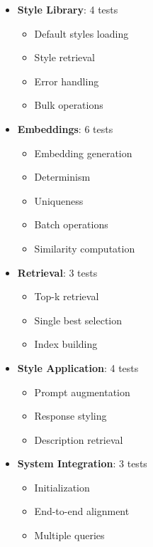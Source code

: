 \documentclass[11pt,a4paper]{article}
\begin{document}
\begin{itemize}
    \item \textbf{Style Library}: 4 tests
    \begin{itemize}
        \item Default styles loading
        \item Style retrieval
        \item Error handling
        \item Bulk operations
    \end{itemize}
    
    \item \textbf{Embeddings}: 6 tests
    \begin{itemize}
        \item Embedding generation
        \item Determinism
        \item Uniqueness
        \item Batch operations
        \item Similarity computation
    \end{itemize}
    
    \item \textbf{Retrieval}: 3 tests
    \begin{itemize}
        \item Top-k retrieval
        \item Single best selection
        \item Index building
    \end{itemize}
    
    \item \textbf{Style Application}: 4 tests
    \begin{itemize}
        \item Prompt augmentation
        \item Response styling
        \item Description retrieval
    \end{itemize}
    
    \item \textbf{System Integration}: 3 tests
    \begin{itemize}
        \item Initialization
        \item End-to-end alignment
        \item Multiple queries
    \end{itemize}
\end{itemize}
\end{document}
